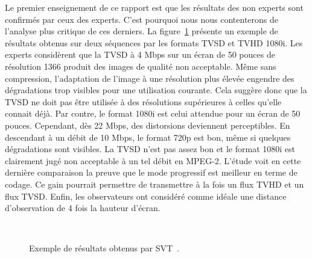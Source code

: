 Le premier enseignement de ce rapport est que les résultats des non experts sont confirmés par ceux des experts. C'est pourquoi nous nous contenterons de l'analyse plus critique de ces derniers. La figure~\ref{fig:svtAssessStudy} présente un exemple de résultats obtenus sur deux séquences par les formats TVSD et TVHD 1080i. Les experts considèrent que la TVSD à 4 Mbps sur un écran de 50 pouces de résolution 1366 produit des images de qualité non acceptable. Même sans compression, l'adaptation de l'image à une résolution plus élevée engendre des dégradations trop visibles pour une utilisation courante. Cela suggère donc que la TVSD ne doit pas être utilisée à des résolutions supérieures à celles qu'elle connait déjà. Par contre, le format 1080i est celui attendue pour un écran de 50 pouces. Cependant, dès 22 Mbps, des distorsions deviennent perceptibles. En descendant à un débit de 10 Mbps, le format 720p est bon, même si quelques dégradations sont visibles. La TVSD n'est pas assez bon et le format 1080i est clairement jugé non acceptable à un tel débit en MPEG-2. L'étude voit en cette dernière comparaison la preuve que le mode progressif est meilleur en terme de codage. Ce gain pourrait permettre de transmettre à la fois un flux TVHD et un flux TVSD. Enfin, les observateurs ont considéré comme idéale une distance d'observation de 4 fois la hauteur d'écran.

\begin{figure}[htbp]
	\centering
	\hfill
	\\
	\caption{Exemple de résultats obtenus par SVT~\cite{svt-assesstudy}.}
	\label{fig:svtAssessStudy}
\end{figure}

